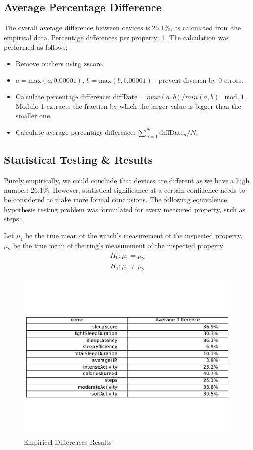 \subsection{Average Percentage Difference}
The overall average difference between devices is 26.1\%, as calculated from the empirical data. Percentage differences per property: \ref{fig:empirical}. The calculation was performed as follows: 
\begin{itemize}
    \item Remove outliers using zscore.
    \item $a = \text{max}(a, 0.00001)$, $b = \text{max}(b, 0.00001)$ - prevent division by 0 errors.
    \item Calculate percentage difference: $\text{diffDate} = max(a,b) / min(a,b) \mod 1$. Modulo 1 extracts the fraction by which the larger value is bigger than the smaller one.
    \item Calculate average percentage difference: $\sum_{n=1}^{N} \text{diffDate}_n / N$.
\end{itemize}
\subsection{Statistical Testing \& Results}
Purely empirically, we could conclude that devices are different as we have a high number: 26.1\%. However, statistical significance at a certain confidence needs to be considered to make more formal conclusions. The following equivalence hypothesis testing problem was formulated for every measured property, such as steps: 

Let $\mu_1$ be the true mean of the watch's measurement of the inspected property, $\mu_2$ be the true mean of the ring's measurement of the inspected property
\begin{align*}
    H_0:\mu_1 = \mu_2 \\
    H_1: \mu_1 \neq \mu_2
\end{align*}
\begin{figure}
    
    \centering
    \includegraphics[width=\textwidth,keepaspectratio]{../images/empiricalResults.pdf}
    \caption{Empirical Differences Results}
    \label{fig:empirical}
    
\end{figure}

